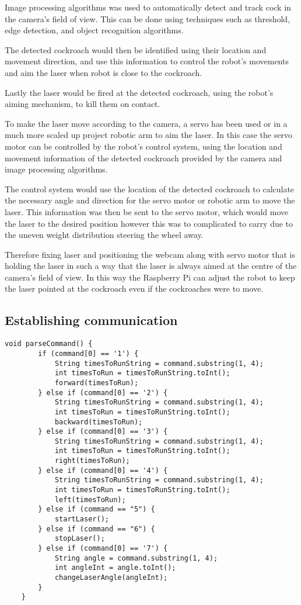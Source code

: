\documentclass[11pt]{article}
\begin{document}
	
	Image processing algorithms  was used to automatically detect and track cock in the camera's field of view. This can be done using techniques such as threshold, edge detection, and object recognition algorithms.
	
	The detected cockroach would then be identified using  their location and movement direction, and use this information to control the robot's movements and aim the laser when robot is close to the cockroach.
	
	Lastly the laser would be fired at the detected cockroach, using the robot's aiming mechanism, to kill them on contact.
	
	
	To make the laser move according to the camera, a servo has been used or in a much more scaled up project robotic arm to aim the laser. In this case the servo motor can be controlled by the robot's control system, using the location and movement information of the detected cockroach provided by the camera and image processing algorithms.
	
	The control system would use the location of the detected cockroach to calculate the necessary angle and direction for the servo motor or robotic arm to move the laser. This information was then be sent to the servo motor, which would move the laser to the desired position however this was to complicated to carry due to the uneven weight distribution steering the wheel away.
	
	Therefore fixing laser and positioning the webcam along with servo motor that is holding the laser in such a way that the laser is always aimed at the centre of the camera's field of view. In this way the Raspberry Pi can adjust the robot to keep the laser pointed at the cockroach even if the cockroaches were to move.
	


\subsection{ Establishing communication}




\begin{lstlisting}[style=myArduino]
	void parseCommand() {
		if (command[0] == '1') {
			String timesToRunString = command.substring(1, 4);
			int timesToRun = timesToRunString.toInt();
			forward(timesToRun);
		} else if (command[0] == '2') {
			String timesToRunString = command.substring(1, 4);
			int timesToRun = timesToRunString.toInt();
			backward(timesToRun);
		} else if (command[0] == '3') {
			String timesToRunString = command.substring(1, 4);
			int timesToRun = timesToRunString.toInt();
			right(timesToRun);
		} else if (command[0] == '4') {
			String timesToRunString = command.substring(1, 4);
			int timesToRun = timesToRunString.toInt();
			left(timesToRun);
		} else if (command == "5") {
			startLaser();
		} else if (command == "6") {
			stopLaser();
		} else if (command[0] == '7') {
			String angle = command.substring(1, 4);
			int angleInt = angle.toInt();
			changeLaserAngle(angleInt);
		}
	}
\end{lstlisting}
\end{document}
